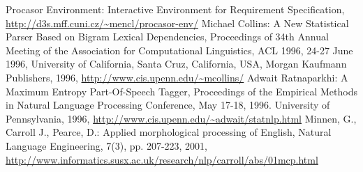 \documentclass[12pt,a4paper]{article}
\begin{document}
\begin{thebibliography}{99}
 Procasor Environment: Interactive Environment for Requirement Specification, \url{http://d3s.mff.cuni.cz/~mencl/procasor-env/}
 Michael Collins: A New Statistical Parser Based on Bigram Lexical Dependencies, Proceedings of 34th Annual Meeting of the Association for Computational Linguistics, ACL 1996, 24-27 June 1996, University of California, Santa Cruz, California, USA, Morgan Kaufmann Publishers, 1996,  \url{http://www.cis.upenn.edu/~mcollins/}
 Adwait Ratnaparkhi: A Maximum Entropy Part-Of-Speech Tagger, Proceedings of the Empirical Methods in Natural Language Processing Conference, May 17-18, 1996. University of Pennsylvania, 1996, \url{http://www.cis.upenn.edu/~adwait/statnlp.html}
 Minnen, G., Carroll J., Pearce, D.: Applied morphological processing of English, Natural Language Engineering, 7(3), pp. 207-223, 2001, \url{http://www.informatics.susx.ac.uk/research/nlp/carroll/abs/01mcp.html}
\end{thebibliography}
\end{document}
